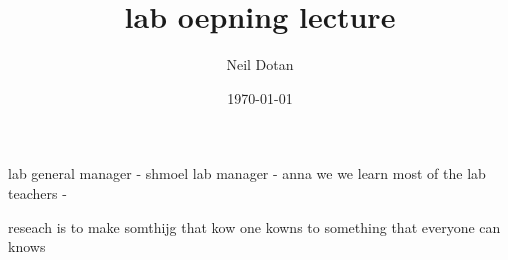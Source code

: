\documentclass{article}
\title{lab oepning lecture}
\author{Neil Dotan}
\date{\today}
\begin{document}
\maketitle
\section{}
lab general manager - shmoel
lab manager - anna
we we learn most of the lab teachers -

reseach is to make somthijg that kow one kowns to something that everyone can knows
\end{document}
